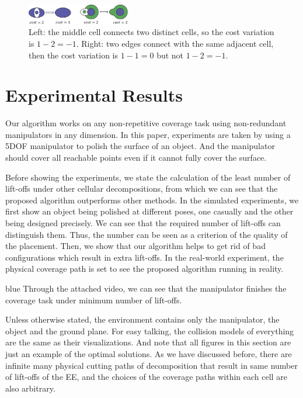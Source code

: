 \documentclass[journal]{IEEEtran}
\begin{document}
\begin{figure}[t]
\centering
\includegraphics[width = 0.4\textwidth]{proof/costcal}
\caption{Left: the middle cell connects two distinct cells, so the cost variation is $1-2 = -1$. Right: two edges connect with the same adjacent cell, then the cost variation is $1-1 = 0$ but not $1-2 = -1$.}\label{figcost}
\end{figure}

\section{Experimental Results}\label{sectionexperiment}

Our algorithm works on any non-repetitive coverage task using non-redundant manipulators in any dimension. 
In this paper, experiments are taken by using a 5DOF manipulator to polish the surface of an object. And the manipulator should cover all reachable points even if it cannot fully cover the surface. 

Before showing the experiments, we state the calculation of the least number of lift-offs under other cellular decompositions, from which we can see that the proposed algorithm outperforms other methods. 
In the simulated experiments, we first show an object being polished at different poses, one casually and the other being designed precisely. We can see that the required number of lift-offs can distinguish them. Thus, the number can be seen as a criterion of the quality of the placement. Then, we show that our algorithm helps to get rid of bad configurations which result in extra lift-offs.
In the real-world experiment, the physical coverage path is set to see the proposed algorithm running in reality. 
\begin{color}{blue}
Through the attached video, we can see that the manipulator finishes the coverage task under minimum number of lift-offs. 
\end{color}

Unless otherwise stated, the environment contains only the manipulator, the object and the ground plane. 
For easy talking, the collision models of everything are the same as their visualizations. 
And note that all figures in this section are just an example of the optimal solutions. 
As we have discussed before, there are infinite many physical cutting paths of decomposition that result in same number of lift-offs of the EE, and the choices of the coverage paths within each cell are also arbitrary.
\end{document}
